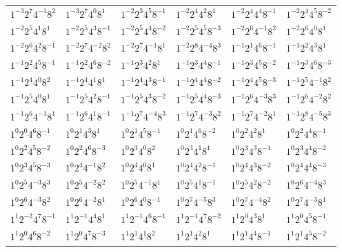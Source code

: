 \documentclass[12pt]{amsart}
\numberwithin{equation}{section}
\theoremstyle{plain}
\theoremstyle{definition}
\theoremstyle{remark}
\begin{document}
\begin{longtable}{llllll}
$1^{-3}2^{7}4^{-1}8^{2}$ & $1^{-3}2^{7}4^{0}8^{1}$ & $1^{-2}2^{3}4^{5}8^{-1}$ & $1^{-2}2^{4}4^{2}8^{1}$ & $1^{-2}2^{4}4^{4}8^{-1}$ & $1^{-2}2^{4}4^{5}8^{-2}$\\
$1^{-2}2^{5}4^{1}8^{1}$ & $1^{-2}2^{5}4^{3}8^{-1}$ & $1^{-2}2^{5}4^{4}8^{-2}$ & $1^{-2}2^{5}4^{5}8^{-3}$ & $1^{-2}2^{6}4^{-1}8^{2}$ & $1^{-2}2^{6}4^{0}8^{1}$\\
$1^{-2}2^{6}4^{2}8^{-1}$ & $1^{-2}2^{7}4^{-2}8^{2}$ & $1^{-2}2^{7}4^{-1}8^{1}$ & $1^{-2}2^{8}4^{-4}8^{3}$ & $1^{-1}2^{1}4^{6}8^{-1}$ & $1^{-1}2^{2}4^{3}8^{1}$\\
$1^{-1}2^{2}4^{5}8^{-1}$ & $1^{-1}2^{2}4^{6}8^{-2}$ & $1^{-1}2^{3}4^{2}8^{1}$ & $1^{-1}2^{3}4^{4}8^{-1}$ & $1^{-1}2^{3}4^{5}8^{-2}$ & $1^{-1}2^{3}4^{6}8^{-3}$\\
$1^{-1}2^{4}4^{0}8^{2}$ & $1^{-1}2^{4}4^{1}8^{1}$ & $1^{-1}2^{4}4^{3}8^{-1}$ & $1^{-1}2^{4}4^{4}8^{-2}$ & $1^{-1}2^{4}4^{5}8^{-3}$ & $1^{-1}2^{5}4^{-1}8^{2}$\\
$1^{-1}2^{5}4^{0}8^{1}$ & $1^{-1}2^{5}4^{2}8^{-1}$ & $1^{-1}2^{5}4^{3}8^{-2}$ & $1^{-1}2^{5}4^{4}8^{-3}$ & $1^{-1}2^{6}4^{-3}8^{3}$ & $1^{-1}2^{6}4^{-2}8^{2}$\\
$1^{-1}2^{6}4^{-1}8^{1}$ & $1^{-1}2^{6}4^{1}8^{-1}$ & $1^{-1}2^{7}4^{-4}8^{3}$ & $1^{-1}2^{7}4^{-3}8^{2}$ & $1^{-1}2^{7}4^{-2}8^{1}$ & $1^{-1}2^{8}4^{-5}8^{3}$\\
$1^{0}2^{0}4^{6}8^{-1}$ & $1^{0}2^{1}4^{3}8^{1}$ & $1^{0}2^{1}4^{5}8^{-1}$ & $1^{0}2^{1}4^{6}8^{-2}$ & $1^{0}2^{2}4^{2}8^{1}$ & $1^{0}2^{2}4^{4}8^{-1}$\\
$1^{0}2^{2}4^{5}8^{-2}$ & $1^{0}2^{2}4^{6}8^{-3}$ & $1^{0}2^{3}4^{0}8^{2}$ & $1^{0}2^{3}4^{1}8^{1}$ & $1^{0}2^{3}4^{3}8^{-1}$ & $1^{0}2^{3}4^{4}8^{-2}$\\
$1^{0}2^{3}4^{5}8^{-3}$ & $1^{0}2^{4}4^{-1}8^{2}$ & $1^{0}2^{4}4^{0}8^{1}$ & $1^{0}2^{4}4^{2}8^{-1}$ & $1^{0}2^{4}4^{3}8^{-2}$ & $1^{0}2^{4}4^{4}8^{-3}$\\
$1^{0}2^{5}4^{-3}8^{3}$ & $1^{0}2^{5}4^{-2}8^{2}$ & $1^{0}2^{5}4^{-1}8^{1}$ & $1^{0}2^{5}4^{1}8^{-1}$ & $1^{0}2^{5}4^{2}8^{-2}$ & $1^{0}2^{6}4^{-4}8^{3}$\\
$1^{0}2^{6}4^{-3}8^{2}$ & $1^{0}2^{6}4^{-2}8^{1}$ & $1^{0}2^{6}4^{0}8^{-1}$ & $1^{0}2^{7}4^{-5}8^{3}$ & $1^{0}2^{7}4^{-4}8^{2}$ & $1^{0}2^{7}4^{-3}8^{1}$\\
$1^{1}2^{-2}4^{7}8^{-1}$ & $1^{1}2^{-1}4^{4}8^{1}$ & $1^{1}2^{-1}4^{6}8^{-1}$ & $1^{1}2^{-1}4^{7}8^{-2}$ & $1^{1}2^{0}4^{3}8^{1}$ & $1^{1}2^{0}4^{5}8^{-1}$\\
$1^{1}2^{0}4^{6}8^{-2}$ & $1^{1}2^{0}4^{7}8^{-3}$ & $1^{1}2^{1}4^{1}8^{2}$ & $1^{1}2^{1}4^{2}8^{1}$ & $1^{1}2^{1}4^{4}8^{-1}$ & $1^{1}2^{1}4^{5}8^{-2}$\\

\end{longtable}
\end{document}
